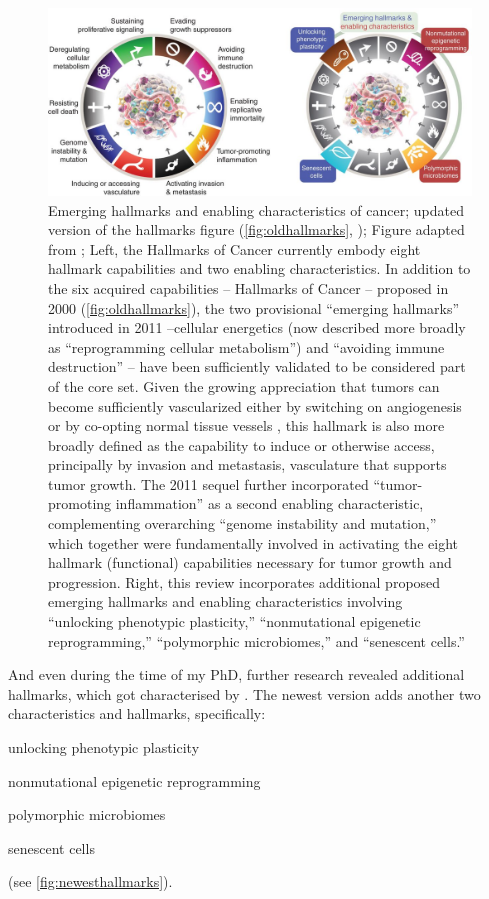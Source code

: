 {\begin{figure}[hbp]
\centering
\includegraphics[width=.9\linewidth]{Figures/intro/NewestHallmarksOfCancer.jpg}
\caption[Newest hallmarks of cancer]{Emerging hallmarks and enabling characteristics of cancer; updated version of the hallmarks figure (\autoref{fig:oldhallmarks}, \cite{Hanahan2000}); Figure adapted from \protect\textcite{Hanahan2022}; Left, the Hallmarks of Cancer currently embody eight hallmark capabilities and two enabling characteristics. In addition to the six acquired capabilities -- Hallmarks of Cancer -- proposed in 2000 (\autoref{fig:oldhallmarks}), the two provisional “emerging hallmarks” introduced in 2011 \cite{Hanahan2011} --cellular energetics (now described more broadly as “reprogramming cellular metabolism”) and “avoiding immune destruction” -- have been sufficiently validated to be considered part of the core set. Given the growing appreciation that tumors can become sufficiently vascularized either by switching on angiogenesis or by co-opting normal tissue vessels \cite{Kuczynski2019}, this hallmark is also more broadly defined as the capability to induce or otherwise access, principally by invasion and metastasis, vasculature that supports tumor growth. The 2011 sequel further incorporated “tumor-promoting inflammation” as a second enabling characteristic, complementing overarching “genome instability and mutation,” which together were fundamentally involved in activating the eight hallmark (functional) capabilities necessary for tumor growth and progression. Right, this review incorporates additional proposed emerging hallmarks and enabling characteristics involving “unlocking phenotypic plasticity,” “nonmutational epigenetic reprogramming,” “polymorphic microbiomes,” and “senescent cells.”}\label{fig:newesthallmarks}
\end{figure}

And even during the time of my PhD, further research revealed additional hallmarks, which got characterised by \textcite{Hanahan2022}. The newest version adds another two characteristics and hallmarks, specifically:
\begin{enumerate*}
\item unlocking phenotypic plasticity 
\item nonmutational epigenetic reprogramming
\item polymorphic microbiomes
\item senescent cells
\end{enumerate*} 
(see \autoref{fig:newesthallmarks}).

}
